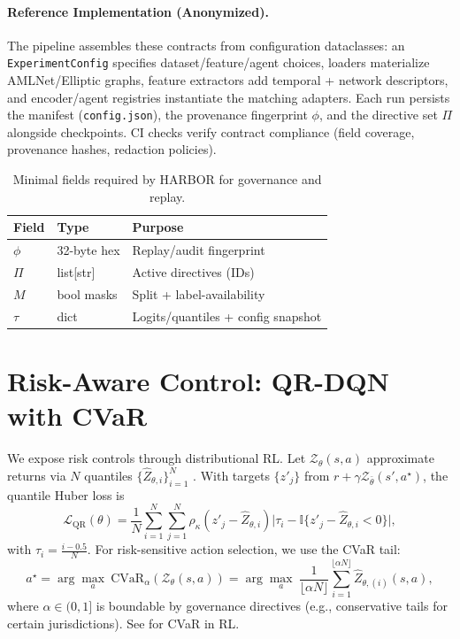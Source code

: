 \documentclass[letterpaper]{article}
\begin{document}
\paragraph{Reference Implementation (Anonymized).}
The pipeline assembles these contracts from configuration dataclasses: an \texttt{ExperimentConfig} specifies dataset/feature/agent choices, loaders materialize AMLNet/Elliptic graphs, feature extractors add temporal + network descriptors, and encoder/agent registries instantiate the matching adapters. Each run persists the manifest (\texttt{config.json}), the provenance fingerprint $\phi$, and the directive set $\Pi$ alongside checkpoints. CI checks verify contract compliance (field coverage, provenance hashes, redaction policies).

\begin{table}[t]
\centering
\begin{tabular}{@{}lll@{}}
\toprule
Field & Type & Purpose \\
\midrule
$\phi$ & 32-byte hex & Replay/audit fingerprint \\
$\Pi$  & list[str] & Active directives (IDs) \\
$M$    & bool masks & Split + label-availability \\
$\tau$ & dict & Logits/quantiles + config snapshot \\
\bottomrule
\end{tabular}
\caption{Minimal fields required by \textsc{HARBOR} for governance and replay.}
\label{tab:contract}
\end{table}

\section{Risk-Aware Control: QR-DQN with CVaR}
\label{sec:risk}
We expose risk controls through distributional RL. Let $\mathcal{Z}_\theta(s,a)$ approximate returns via $N$ quantiles $\{\hat{Z}_{\theta,i}\}_{i=1}^N$ \citep{dabney2018distributional}. With targets $\{z'_j\}$ from $r+\gamma \mathcal{Z}_{\bar\theta}(s',a^\star)$, the quantile Huber loss is
\begin{equation}
\mathcal{L}_{\text{QR}}(\theta)=\frac{1}{N}\!\sum_{i=1}^N \sum_{j=1}^N
\rho_{\kappa}\!\left(z'_j - \hat{Z}_{\theta,i}\right)\!
\Big|\tau_i - \mathbb{I}\{z'_j - \hat{Z}_{\theta,i} < 0\}\Big|,
\end{equation}
with $\tau_i=\frac{i-0.5}{N}$. For risk-sensitive action selection, we use the CVaR tail:
\begin{equation}
a^\star = \arg\max_{a}\ \text{CVaR}_\alpha\!\left(\mathcal{Z}_\theta(s,a)\right)
= \arg\max_{a}\ \frac{1}{\lfloor \alpha N \rfloor}\!\sum_{i=1}^{\lfloor \alpha N \rfloor}\hat{Z}_{\theta,(i)}(s,a),
\end{equation}
where $\alpha\in(0,1]$ is boundable by governance directives (e.g., conservative tails for certain jurisdictions). See \citet{chow2015risk} for CVaR in RL.
\end{document}
